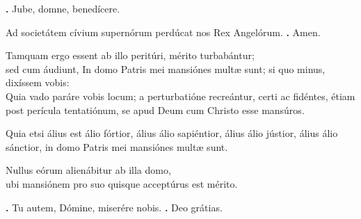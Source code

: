 \begin{small}
\textbf{\Vbar.} Jube, domne, benedícere.

Ad societátem cívium supernórum perdúcat nos Rex Angelórum.
\textbf{\Rbar.} Amen.
\end{small}


Tamquam ergo essent ab illo peritúri, mérito turbabántur; \\
sed cum áudiunt, In domo Patris mei mansiónes multæ sunt; si quo minus, dixíssem vobis: \\
Quia vado paráre vobis locum; a perturbatióne recreántur, certi ac fidéntes, étiam post perícula tentatiónum, se apud Deum cum Christo esse mansúros. 

Quia etsi álius est álio fórtior, álius álio sapiéntior, álius álio jústior, álius álio sánctior, in domo Patris mei mansiónes multæ sunt. 

Nullus eórum alienábitur ab illa domo, \\
ubi mansiónem pro suo quisque acceptúrus est mérito.

\textbf{\Vbar.} Tu autem, Dómine, miserére nobis.
\textbf{\Rbar.} Deo grátias.

